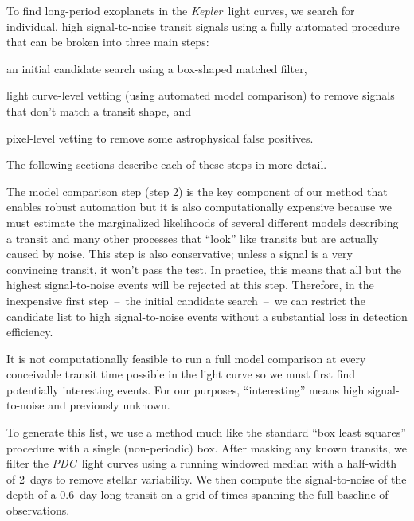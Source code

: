 \documentclass[manuscript, letterpaper]{aastex6}
\makeatletter
\let\origsubsection\subsection
\renewcommand\subsection{\@ifstar{\starsubsection}{\nostarsubsection}}
\newcommand\nostarsubsection[1]{\subsectionprelude\origsubsection{#1}}
\newcommand\starsubsection[1]{\subsectionprelude\origsubsection*{#1}}
\newcommand\subsectionprelude{\vspace{1em}}
\newcommand{\project}[1]{\textsl{#1}}
\newcommand{\kepler}{\project{Kepler}}
\newcommand{\pdc}{\project{PDC}}
\newcommand{\bls}{\project{BLS}}
\newcommand{\sectlabel}[1]{\label{sect:#1}}
\makeatother
\begin{document}
To find long-period exoplanets in the \kepler\ light curves, we search for
individual, high signal-to-noise transit signals using a fully automated
procedure that can be broken into three main steps:
\begin{enumerate}
{\item an initial candidate search using a box-shaped matched filter,}
{\item light curve-level vetting (using automated model comparison) to remove
signals that don't match a transit shape, and}
{\item pixel-level vetting to remove some astrophysical false positives.}
\end{enumerate}
The following sections describe each of these steps in more detail.

The model comparison step (step 2) is the key component of our method that
enables robust automation but it is also computationally expensive because we
must estimate the marginalized likelihoods of several different models
describing a transit and many other processes that ``look'' like transits but
are actually caused by noise.
This step is also conservative; unless a signal is a very convincing transit,
it won't pass the test.
In practice, this means that all but the highest signal-to-noise events will
be rejected at this step.
Therefore, in the inexpensive first step~--~the initial candidate search~--~we
can restrict the candidate list to high signal-to-noise events without a
substantial loss in detection efficiency.

\subsection{Step 1 -- Initial candidate events}\sectlabel{stepone}

It is not computationally feasible to run a full model comparison at every
conceivable transit time possible in the light curve so we must first find
potentially interesting events.
For our purposes, ``interesting'' means high signal-to-noise and previously
unknown.

To generate this list, we use a method much like the standard ``box least
squares'' \citep[\bls;][]{Kovacs:2002} procedure with a single (non-periodic)
box.
After masking any known transits, we filter the \pdc\ light curves
\citep{Stumpe:2012, Smith:2012} using a running windowed median with a
half-width of 2~days to remove stellar variability.
We then compute the signal-to-noise of the depth of a 0.6~day long
transit on a grid of times spanning the full baseline of observations.
\end{document}
